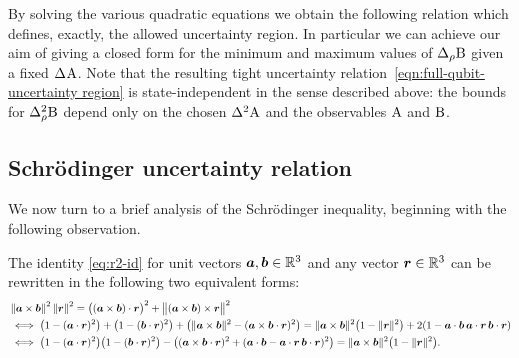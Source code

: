 By solving the various quadratic equations  we obtain the following relation which defines, exactly, the allowed uncertainty region. In particular we can achieve our aim of giving a closed form for the minimum and maximum values of $\sdevr{\opb}$  given a fixed $\sdev{\opa}$. Note that the resulting tight uncertainty relation~\eqref{eqn:full-qubit-uncertainty region} is state-independent in the sense described above: the bounds for $\varr{\opb}$ depend only on the chosen $\var{\opa}$ and the observables $\operatorname{A}$ and $\operatorname{B}$.

\subsection{Schr\"odinger uncertainty relation}\label{sec:sch-uncertainty-relation}


We now turn to a brief analysis of the Schr\"odinger inequality, beginning with the following observation.
\begin{lem}
The identity \eqref{eq:r2-id} for unit vectors $\bm{a},\bm{b}\in\mathbb{R}^3$ and any vector $\bm{r}\in\mathbb{R}^3$ can be rewritten in the following two equivalent forms:
\begin{align}
 & \left\|\bm{a}\times\bm{b}\right\|^2 \left\|\bm{r}\right\|^2 = \bigl((\bm{a}\times\bm{b})\cdot\bm{r}\bigr)^2 + \bigl\|(\bm{a}\times\bm{b})\times\bm{r}\bigr\|^2\\
 &\iff  \left(1-(\bm{a}\cdot\bm{r})^2\right)+\left(1-(\bm{b}\cdot\bm{r})^2\right)+\left(\|\bm{a}\times\bm{b}\|^2-(\bm{a}\times\bm{b}\cdot\bm{r})^2\right)=\|\bm{a}\times\bm{b}\|^2\bigl(1-\|\bm{r}\|^2\bigr)+2(1-\bm{a}\cdot\bm{b}\,\bm{a}\cdot\bm{r}\,\bm{b}\cdot\bm{r})\label{eq:r2-id2}\\
 &\iff \bigl(1-(\bm{a}\cdot\bm{r})^2\bigr)\bigl(1-(\bm{b}\cdot\bm{r})^2\bigr)-
    \left((\bm{a}\times\bm{b}\cdot\bm{r})^2+(\bm{a}\cdot\bm{b}-\bm{a}\cdot\bm{r}\,\bm{b}\cdot\bm{r})^2\right)=\|\bm{a}\times\bm{b}\|^2\bigl(1-\|\bm{r}\|^2\bigr).\label{eq:r2-id3}
\end{align}
\end{lem}
